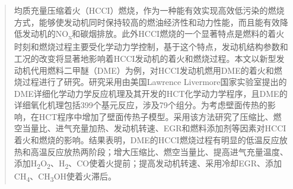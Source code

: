 \begin{abstract}
均质充量压缩着火（HCCI）燃烧，作为一种能有效实现高效低污染的燃烧方式，能够使发动机同时保持较高的燃油经济性和动力性能，而且能有效降低发动机的NO\textsubscript{x}和碳烟排放。此外HCCI燃烧的一个显著特点是燃料的着火时刻和燃烧过程主要受化学动力学控制，基于这个特点，发动机结构参数和工况的改变将显著地影响着HCCI发动机的着火和燃烧过程。本文以新型发动机代用燃料二甲醚（DME）为例，对HCCI发动机燃用DME的着火和燃烧过程进行了研究。研究采用由美国Lawrence Livermore国家实验室提出的DME详细化学动力学反应机理及其开发的HCT化学动力学程序，且DME的详细氧化机理包括399个基元反应，涉及79个组分。为考虑壁面传热的影响，在HCT程序中增加了壁面传热子模型。采用该方法研究了压缩比、燃空当量比、进气充量加热、发动机转速、EGR和燃料添加剂等因素对HCCI着火和燃烧的影响。结果表明，DME的HCCI燃烧过程有明显的低温反应放热和高温反应放热两阶段；增大压缩比、燃空当量比、提高进气充量温度、添加H\textsubscript{2}O\textsubscript{2}、H\textsubscript{2}、CO使着火提前；提高发动机转速、采用冷却EGR、添加CH\textsubscript{4}、CH\textsubscript{3}OH使着火滞后。
\end{abstract}

